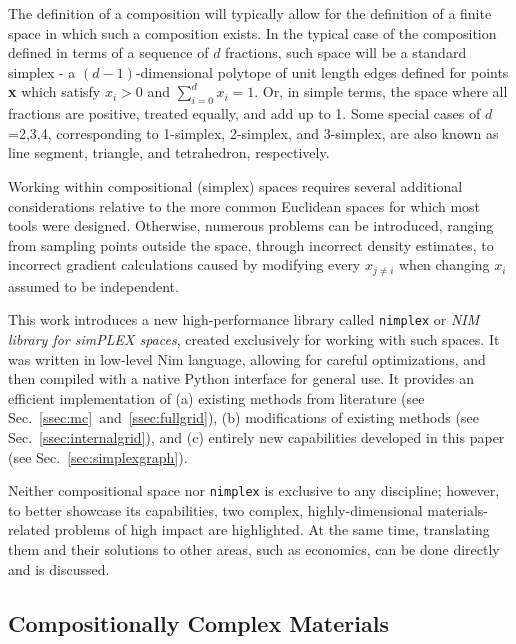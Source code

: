 The definition of a composition will typically allow for the definition of a finite space in which such a composition exists. In the typical case of the composition defined in terms of a sequence of $d$ fractions, such space will be a standard simplex - a $(d-1)$-dimensional polytope of unit length edges defined for points \textbf{x} which satisfy $x_i>0$ and $\sum_{i=0}^d x_i = 1$. Or, in simple terms, the space where all fractions are positive, treated equally, and add up to 1. Some special cases of $d$=2,3,4, corresponding to 1-simplex, 2-simplex, and 3-simplex, are also known as line segment, triangle, and tetrahedron, respectively.

Working within compositional (simplex) spaces requires several additional considerations relative to the more common Euclidean spaces for which most tools were designed. Otherwise, numerous problems can be introduced, ranging from sampling points outside the space, through incorrect density estimates, to incorrect gradient calculations caused by modifying every $x_{j\neq i}$ when changing $x_i$ assumed to be independent.

This work introduces a new high-performance library called \texttt{nimplex} or \textit{NIM library for simPLEX spaces}, created exclusively for working with such spaces. It was written in low-level Nim language, allowing for careful optimizations, and then compiled with a native Python interface for general use. It provides an efficient implementation of (a) existing methods from literature (see Sec.~\ref{ssec:mc}~and~\ref{ssec:fullgrid}), (b) modifications of existing methods (see Sec.~\ref{ssec:internalgrid}), and (c) entirely new capabilities developed in this paper (see Sec.~\ref{sec:simplexgraph}).

Neither compositional space nor \texttt{nimplex} is exclusive to any discipline; however, to better showcase its capabilities, two complex, highly-dimensional materials-related problems of high impact are highlighted. At the same time, translating them and their solutions to other areas, such as economics, can be done directly and is discussed.


\subsection{Compositionally Complex Materials} \label{ssec:compositionallycomplex}

